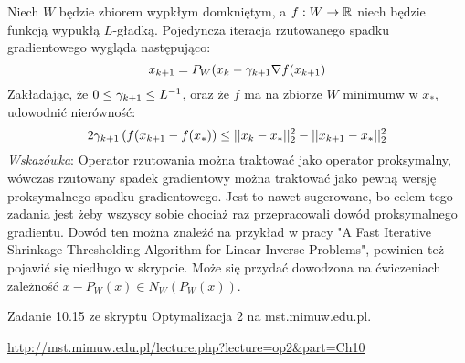 \documentclass[10pt,a4paper,draft]{report}
\begin{document}
\begin{problem}
Niech $W$ będzie zbiorem wypkłym domkniętym, a $f: W \rightarrow \mathbb{R}$ niech będzie funkcją wypukłą $L$-gładką. Pojedyncza iteracja rzutowanego spadku gradientowego wygląda następująco:
\[
x_{k+1} = P_W(x_k - \gamma_{k+1} \nabla f(x_{k+1})
\]
Zakładając, że $0 \leq \gamma_{k+1} \leq L^{-1}$, oraz że $f$ ma na zbiorze $W$ minimumw w $x_*$, udowodnić nierówność: 
\[
2\gamma_{k+1} \left( f(x_{k+1} - f(x_*) \right) \leq ||x_{k} - x_*||_2^2 - ||x_{k+1} - x_*||_2^2 
\]
\textit{Wskazówka}: Operator rzutowania można traktować jako operator proksymalny, wówczas rzutowany spadek gradientowy można traktować jako pewną wersję proksymalnego spadku gradientowego. Jest to nawet sugerowane, bo celem tego zadania jest żeby wszyscy sobie chociaż raz przepracowali dowód proksymalnego gradientu. Dowód ten można znaleźć na przykład w pracy "A Fast Iterative Shrinkage-Thresholding Algorithm for Linear Inverse Problems", powinien też pojawić się niedługo w skrypcie. Może się przydać dowodzona na ćwiczeniach zależność $x - P_W(x) \in N_W(P_W(x))$.
\end{problem}

\begin{problem}
Zadanie 10.15 ze skryptu Optymalizacja 2 na mst.mimuw.edu.pl.

\url{http://mst.mimuw.edu.pl/lecture.php?lecture=op2&part=Ch10}

\end{problem}
\end{document}
